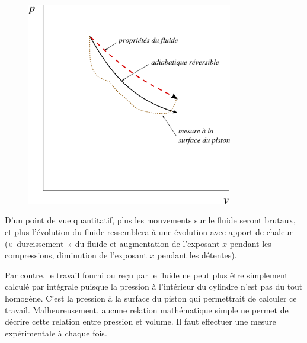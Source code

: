 		\begin{figure}
			\begin{center}
			\includegraphics[width=9cm]{images/pv_detente_irreversible.png}
			\end{center}
			\label{fig_p-v_détente_irr}
		\end{figure}

		D’un point de vue quantitatif, plus les mouvements sur le fluide seront brutaux, et plus l’évolution du fluide ressemblera à une évolution avec apport de chaleur («~durcissement~» du fluide et augmentation de l’exposant $x$ pendant les compressions, diminution de l’exposant $x$ pendant les détentes). 

		Par contre, le travail fourni ou reçu par le fluide ne peut plus être simplement calculé par intégrale puisque la pression à l’intérieur du cylindre n’est pas du tout homogène. C’est la pression à la surface du piston qui permettrait de calculer ce travail. Malheureusement, aucune relation mathématique simple ne permet de décrire cette relation entre pression et volume. Il faut effectuer une mesure expérimentale à chaque fois.
		
